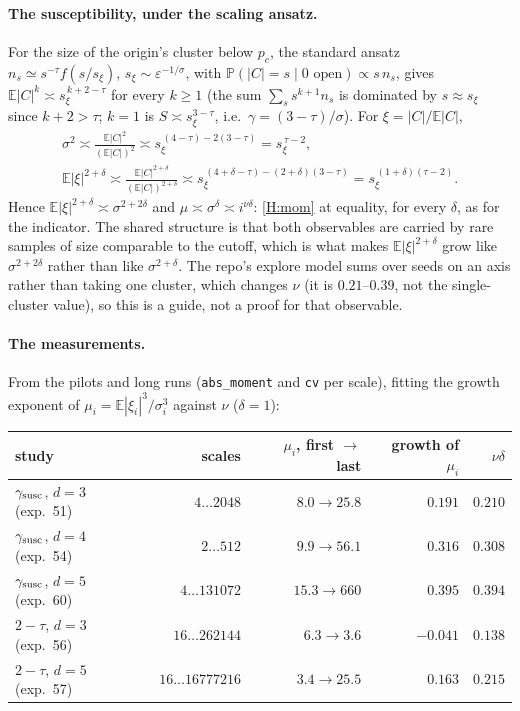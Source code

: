 \documentclass[11pt]{article}
\newcommand{\E}{\mathbb{E}}
\newcommand{\Prob}{\mathbb{P}}
\begin{document}
\paragraph{The susceptibility, under the scaling ansatz.}
For the size of the origin's cluster below $p_c$, the standard ansatz
$n_s\simeq s^{-\tau}f(s/s_\xi)$, $s_\xi\sim\varepsilon^{-1/\sigma}$, with
$\Prob(|C|=s\mid0\text{ open})\propto s\,n_s$, gives
$\E|C|^k\asymp s_\xi^{\,k+2-\tau}$ for every $k\ge1$ (the sum
$\sum_s s^{k+1}n_s$ is dominated by $s\approx s_\xi$ since $k+2>\tau$; $k=1$ is
$S\asymp s_\xi^{3-\tau}$, i.e.\ $\gamma=(3-\tau)/\sigma$). For
$\xi=|C|/\E|C|$,
\begin{gather*}
  \sigma^2\asymp\frac{\E|C|^2}{(\E|C|)^2}\asymp s_\xi^{\,(4-\tau)-2(3-\tau)}=s_\xi^{\,\tau-2},
  \\
  \E|\xi|^{2+\delta}\asymp\frac{\E|C|^{2+\delta}}{(\E|C|)^{2+\delta}}
  \asymp s_\xi^{\,(4+\delta-\tau)-(2+\delta)(3-\tau)}=s_\xi^{\,(1+\delta)(\tau-2)}.
\end{gather*}
Hence $\E|\xi|^{2+\delta}\asymp\sigma^{2+2\delta}$ and
$\mu\asymp\sigma^{\delta}\asymp i^{\nu\delta}$: \ref{H:mom} at equality, for
every $\delta$, as for the indicator. The shared structure is that both
observables are carried by rare samples of size comparable to the cutoff,
which is what makes $\E|\xi|^{2+\delta}$ grow like $\sigma^{2+2\delta}$
rather than like $\sigma^{2+\delta}$. The repo's explore model sums over seeds on
an axis rather than taking one cluster, which changes $\nu$ (it is $0.21$--$0.39$,
not the single-cluster value), so this is a guide, not a proof for that
observable.

\paragraph{The measurements.}
From the pilots and long runs (\texttt{abs\_moment} and \texttt{cv} per scale),
fitting the growth exponent of $\mu_i=\E|\xi_i|^3/\sigma_i^3$ against $\nu$
($\delta=1$):

\begin{center}
\begin{tabular}{@{}lrrrr@{}}
\toprule
study & scales & $\mu_i$, first $\to$ last & growth of $\mu_i$ & $\nu\delta$\\
\midrule
$\gamma_{\rm susc}$, $d=3$ (exp.~51) & $4\ldots2048$ & $8.0\to25.8$ & $0.191$ & $0.210$\\
$\gamma_{\rm susc}$, $d=4$ (exp.~54) & $2\ldots512$ & $9.9\to56.1$ & $0.316$ & $0.308$\\
$\gamma_{\rm susc}$, $d=5$ (exp.~60) & $4\ldots131072$ & $15.3\to660$ & $0.395$ & $0.394$\\
$2-\tau$, $d=3$ (exp.~56) & $16\ldots262144$ & $6.3\to3.6$ & $-0.041$ & $0.138$\\
$2-\tau$, $d=5$ (exp.~57) & $16\ldots16777216$ & $3.4\to25.5$ & $0.163$ & $0.215$\\
\bottomrule
\end{tabular}
\end{center}
\end{document}
